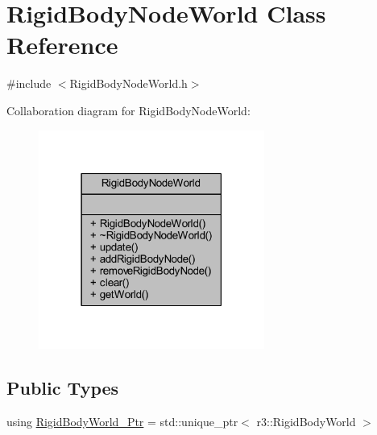 \hypertarget{class_rigid_body_node_world}{}\section{Rigid\+Body\+Node\+World Class Reference}
\label{class_rigid_body_node_world}


{\ttfamily \#include $<$Rigid\+Body\+Node\+World.\+h$>$}



Collaboration diagram for Rigid\+Body\+Node\+World\+:\nopagebreak
\begin{figure}[H]
\begin{center}
\leavevmode
\includegraphics[width=210pt]{class_rigid_body_node_world__coll__graph}
\end{center}
\end{figure}
\subsection*{Public Types}
\begin{DoxyCompactItemize}
\item 
using \mbox{\hyperlink{class_rigid_body_node_world_a34a1badfc25cc91284fb98c9421bd35a}{Rigid\+Body\+World\+\_\+\+Ptr}} = std\+::unique\+\_\+ptr$<$ r3\+::\+Rigid\+Body\+World $>$
\end{DoxyCompactItemize}
